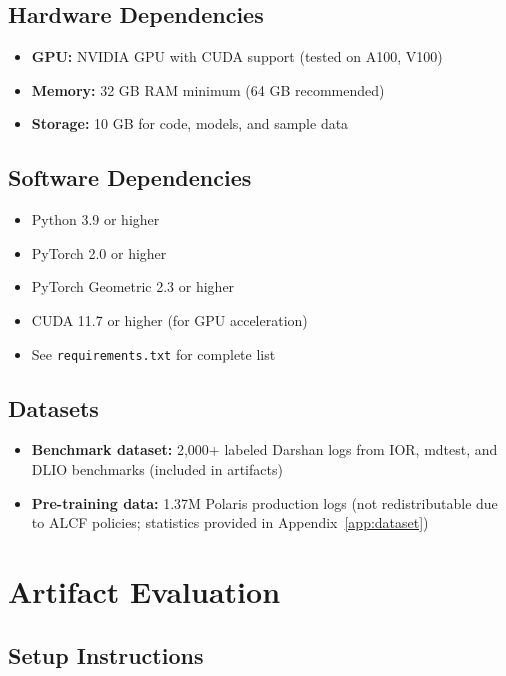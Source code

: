 \subsection{Hardware Dependencies}

\begin{itemize}
    \item \textbf{GPU:} NVIDIA GPU with CUDA support (tested on A100, V100)
    \item \textbf{Memory:} 32 GB RAM minimum (64 GB recommended)
    \item \textbf{Storage:} 10 GB for code, models, and sample data
\end{itemize}

\subsection{Software Dependencies}

\begin{itemize}
    \item Python 3.9 or higher
    \item PyTorch 2.0 or higher
    \item PyTorch Geometric 2.3 or higher
    \item CUDA 11.7 or higher (for GPU acceleration)
    \item See \texttt{requirements.txt} for complete list
\end{itemize}

\subsection{Datasets}

\begin{itemize}
    \item \textbf{Benchmark dataset:} 2,000+ labeled Darshan logs from IOR, mdtest, and DLIO benchmarks (included in artifacts)
    \item \textbf{Pre-training data:} 1.37M Polaris production logs (not redistributable due to ALCF policies; statistics provided in Appendix~\ref{app:dataset})
\end{itemize}

\section{Artifact Evaluation}
\label{app:artifact-evaluation}

\subsection{Setup Instructions}

